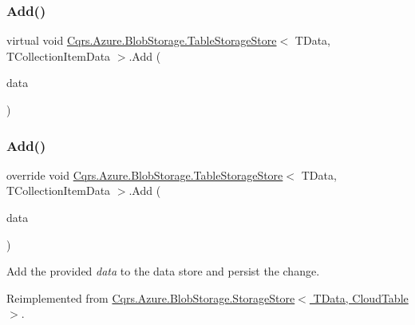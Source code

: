 \subsubsection{\texorpdfstring{Add()}{Add()}\hspace{0.1cm}{\footnotesize\ttfamily [2/6]}}
{\footnotesize\ttfamily virtual void \hyperlink{classCqrs_1_1Azure_1_1BlobStorage_1_1TableStorageStore}{Cqrs.\+Azure.\+Blob\+Storage.\+Table\+Storage\+Store}$<$ T\+Data, T\+Collection\+Item\+Data $>$.Add (\begin{DoxyParamCaption}\item[{I\+Table\+Entity}]{data }\end{DoxyParamCaption})\hspace{0.3cm}{\ttfamily [virtual]}}

\mbox{\label{classCqrs_1_1Azure_1_1BlobStorage_1_1TableStorageStore_a2b10c02a19150d5a68e6dcb4810ea8a1_a2b10c02a19150d5a68e6dcb4810ea8a1}} 
\subsubsection{\texorpdfstring{Add()}{Add()}\hspace{0.1cm}{\footnotesize\ttfamily [3/6]}}
{\footnotesize\ttfamily override void \hyperlink{classCqrs_1_1Azure_1_1BlobStorage_1_1TableStorageStore}{Cqrs.\+Azure.\+Blob\+Storage.\+Table\+Storage\+Store}$<$ T\+Data, T\+Collection\+Item\+Data $>$.Add (\begin{DoxyParamCaption}\item[{I\+Enumerable$<$ T\+Data $>$}]{data }\end{DoxyParamCaption})\hspace{0.3cm}{\ttfamily [virtual]}}



Add the provided {\itshape data}  to the data store and persist the change. 



Reimplemented from \hyperlink{classCqrs_1_1Azure_1_1BlobStorage_1_1StorageStore_a989d749e5f9efc10b1a416feec02657d_a989d749e5f9efc10b1a416feec02657d}{Cqrs.\+Azure.\+Blob\+Storage.\+Storage\+Store$<$ T\+Data, Cloud\+Table $>$}.

